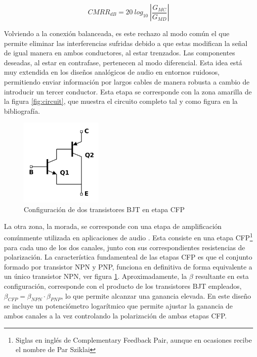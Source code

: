 \begin{equation}
\label{eq:cmrr}
CMRR_{dB} = 20~log_{10}~\left |\frac{G_{MC}}{G_{MD}} \right |
\end{equation}

Volviendo a la conexión balanceada, es este rechazo al modo común el que permite eliminar las interferencias sufridas debido a que estas modifican la señal de igual manera en ambos conductores, al estar trenzados. Las componentes deseadas, al estar en contrafase, pertenecen al modo diferencial. Esta idea está muy extendida en los diseños analógicos de audio en entornos ruidosos, permitiendo enviar información por largos cables de manera robusta a cambio de introducir un tercer conductor. Esta etapa se corresponde con la zona amarilla de la figura \ref{fig:circuit}, que muestra el circuito completo tal y como figura en la bibliografía.

\begin{figure}[bht]
\begin{center}
\includegraphics[width=4cm]{img/sziklai.png}
\caption{\label{fig:cfp}Configuración de dos transistores BJT en etapa CFP}
\end{center}
\end{figure}

La otra zona, la morada, se corresponde con una etapa de amplificación comúnmente utilizada en aplicaciones de audio \cite{ampaudio}. Esta consiste en una etapa CFP\footnote{Siglas en inglés de Complementary Feedback Pair, aunque en ocasiones recibe el nombre de Par Sziklai} para cada uno de los dos canales, junto con sus correspondientes resistencias de polarización. La característica fundamenteal de las etapas CFP es que el conjunto formado por transistor NPN y PNP, funciona en definitiva de forma equivalente a un único transistor NPN, ver figura \ref{fig:cfp}. Aproximadamente, la $\beta$ resultante en esta configuración, corresponde con el producto de los transistores BJT empleados, $\beta_{CFP}=\beta_{NPN}\cdot\beta_{PNP}$, lo que permite alcanzar una ganancia elevada. En este diseño se incluye un potenciómetro logarítmico que permite ajustar la ganancia de ambos canales a la vez controlando la polarización de ambas etapas CFP.

